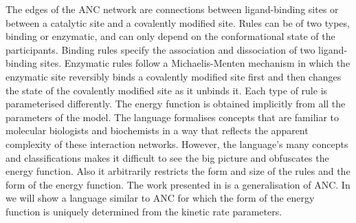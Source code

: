 The edges of the ANC network are connections between ligand-binding sites
or between a catalytic site and a covalently modified site.
Rules can be of two types, binding or enzymatic,
and can only depend on the conformational state of the participants.
Binding rules specify the association and dissociation of
two ligand-binding sites.
Enzymatic rules follow a Michaelis-Menten mechanism in which
the enzymatic site reversibly binds a covalently modified site first
and then changes the state of the covalently modified site
as it unbinds it.
Each type of rule is parameterised differently.
The energy function is obtained implicitly
from all the parameters of the model.
The language formalises concepts that are familiar to
molecular biologists and biochemists
in a way that reflects the apparent complexity
of these interaction networks.
However, the language's many concepts and classifications
makes it difficult to see the big picture
and obfuscates the energy function. %
Also it arbitrarily restricts the form and size of the rules
and the form of the energy function.
The work presented in  is a generalisation of ANC.
In  we will show a language similar to ANC
for which the form of the energy function is uniquely determined
from the kinetic rate parameters.




